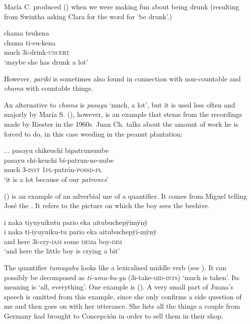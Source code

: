 María C. produced () when we were making fun about being drunk (resulting from Swintha asking Clara for the word for ‘be drunk’.)

\ea\label{ex:chama-verb}
\begingl
\glpreamble chama teukena\\
\gla chama ti-eu-kena\\
\glb much 3i-drink-\textsc{uncert}\\
\glft ‘maybe she has drunk a lot’
\endgl
\trailingcitation{[cux-c120414ls-1.056]}
\xe

However, \textit{pariki} is sometimes also found in connection with non-countable and \textit{chama} with countable things.

An alternative to \textit{chama} is \textit{pasayu} ‘much, a lot’, but it is used less often and majorly by María S. (), however, is an example that stems from the recordings made by Riester in the 1960s. Juan Ch. talks about the amount of work he is forced to do, in this case weeding in the peanut plantation:

\ea\label{ex:pasayu-n}
\begingl
\glpreamble ... pasayu chikeuchi bipatrunenube\\
\gla pasayu chi-keuchi bi-patrun-ne-nube\\
\glb much 3-\textsc{inst} 1\textsc{pl}-patrón-\textsc{possd}-\textsc{pl}\\
\glft ‘it is a lot because of our \textit{patrones}’
\endgl
\trailingcitation{[nxx-p630101g-2.26]}
\xe


() is an example of an adverbial use of a quantifier. It comes from Miguel telling José the . It refers to the picture on which the boy sees the beehive.

\ea\label{ex:pario-verb}
\begingl
\glpreamble i naka tiyuyuikutu pario eka aitubuchepÿimÿnÿ\\
\gla i naka ti-iyuyuiku-tu pario eka aitubuchepÿi-mÿnÿ\\
\glb and here 3i-cry-\textsc{iam} some \textsc{dem}a boy-\textsc{dim}\\
\glft ‘and here the little boy is crying a bit’
\endgl
\trailingcitation{[mox-a110920l-2.067]}
\xe


The quantifier \textit{tumuyubu} looks like a lexicalised middle verb (see ). It can possibly be decomposed as \textit{ti-umu-bu-yu} (3i-take-\textsc{mid}-\textsc{ints}) ‘much is taken’. Its meaning is ‘all, everything’. One example is (). A very small part of Juana’s speech is omitted from this example, since she only confirms a side question of me and then goes on with her utterance. She lists all the things a couple from Germany had brought to Concepción in order to sell them in their shop.


